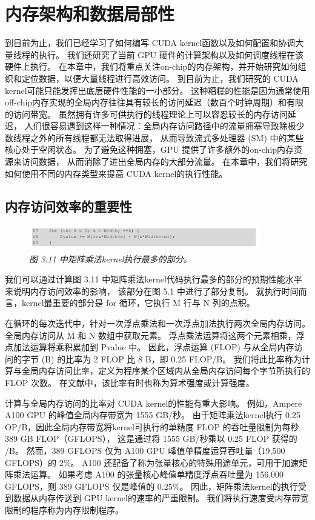 \section{内存架构和数据局部性}
到目前为止，我们已经学习了如何编写 CUDA kernel函数以及如何配置和协调大量线程的执行。 
我们还研究了当前 GPU 硬件的计算架构以及如何调度线程在该硬件上执行。 
在本章中，我们将重点关注on-chip的内存架构，并开始研究如何组织和定位数据，以便大量线程进行高效访问。 
到目前为止，我们研究的 CUDA kernel可能只能发挥出底层硬件性能的一小部分。 
这种糟糕的性能是因为通常使用off-chip内存实现的全局内存往往具有较长的访问延迟（数百个时钟周期）和有限的访问带宽。 
虽然拥有许多可供执行的线程理论上可以容忍较长的内存访问延迟，
人们很容易遇到这样一种情况：全局内存访问路径中的流量拥塞导致除极少数线程之外的所有线程都无法取得进展，
从而导致流式多处理器 (SM) 中的某些核心处于空闲状态。 为了避免这种拥塞，GPU 提供了许多额外的on-chip内存资源来访问数据，
从而消除了进出全局内存的大部分流量。 在本章中，我们将研究如何使用不同的内存类型来提高 CUDA kernel的执行性能。

\subsection{内存访问效率的重要性}
\begin{figure}[H]
	\centering
	\includegraphics[width=0.9\textwidth]{figs/F5.1.png}
	\caption{\textit{图 3.11 中矩阵乘法kernel执行最多的部分。}}
\end{figure}

我们可以通过计算图 3.11 中矩阵乘法kernel代码执行最多的部分的预期性能水平来说明内存访问效率的影响，
该部分在图 5.1 中进行了部分复制。 就执行时间而言，kernel最重要的部分是 for 循环，它执行 M 行与 N 列的点积。

在循环的每次迭代中，针对一次浮点乘法和一次浮点加法执行两次全局内存访问。 全局内存访问从 M 和 N 数组中获取元素。 
浮点乘法运算将这两个元素相乘，浮点加法运算将乘积累加到 Pvalue 中。 
因此，浮点运算 (FLOP) 与从全局内存访问的字节 (B) 的比率为 2 FLOP 比 8 B，即 0.25 FLOP/B。 
我们将此比率称为计算与全局内存访问比率，定义为程序某个区域内从全局内存访问每个字节所执行的 FLOP 次数。 
在文献中，该比率有时也称为算术强度或计算强度。

计算与全局内存访问的比率对 CUDA kernel的性能有重大影响。 例如，Ampere A100 GPU 的峰值全局内存带宽为 1555 GB/秒。 
由于矩阵乘法kernel执行 0.25 OP/B，因此全局内存带宽将kernel可执行的单精度 FLOP 的吞吐量限制为每秒 389 GB FLOP（GFLOPS），
这是通过将 1555 GB/秒乘以 0.25 FLOP 获得的 /B。 
然而，389 GFLOPS 仅为 A100 GPU 峰值单精度运算吞吐量（19,500 GFLOPS）的 2\%。 
A100 还配备了称为张量核心的特殊用途单元，可用于加速矩阵乘法运算。 
如果考虑 A100 的张量核心峰值单精度浮点吞吐量为 156,000 GFLOPS，则 389 GFLOPS 仅是峰值的 0.25\%。 
因此，矩阵乘法kernel的执行受到数据从内存传送到 GPU kernel的速率的严重限制。 
我们将执行速度受内存带宽限制的程序称为内存限制程序。

